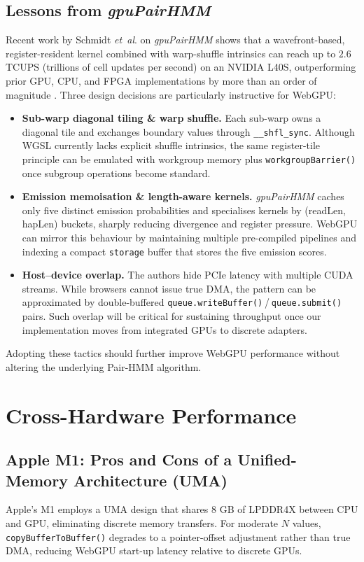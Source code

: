 \documentclass[PhD]{PHlab-thesis}
\begin{document}
\subsection{Lessons from \textit{gpuPairHMM}}
Recent work by Schmidt \emph{et~al}. on \textit{gpuPairHMM} shows that a wavefront-based, register-resident kernel combined with warp-shuffle intrinsics can reach up to $2.6$ TCUPS (trillions of cell updates per second) on an NVIDIA L40S, outperforming prior GPU, CPU, and FPGA implementations by more than an order of magnitude \cite{Schmidt2024gpuPairHMM}. Three design decisions are particularly instructive for WebGPU:

\begin{itemize}
  \item \textbf{Sub-warp diagonal tiling \& warp shuffle.}  
        Each sub-warp owns a diagonal tile and exchanges boundary values through \texttt{\_\_shfl\_sync}.  
        Although WGSL currently lacks explicit shuffle intrinsics, the same register-tile principle can be emulated with workgroup memory plus \texttt{workgroupBarrier()} once subgroup operations become standard.
  \item \textbf{Emission memoisation \& length-aware kernels.}  
        \textit{gpuPairHMM} caches only five distinct emission probabilities and specialises kernels by (readLen, hapLen) buckets, sharply reducing divergence and register pressure.  
        WebGPU can mirror this behaviour by maintaining multiple pre-compiled pipelines and indexing a compact \texttt{storage} buffer that stores the five emission scores.
  \item \textbf{Host–device overlap.}  
        The authors hide PCIe latency with multiple CUDA streams.  
        While browsers cannot issue true DMA, the pattern can be approximated by double-buffered \texttt{queue.writeBuffer()} / \texttt{queue.submit()} pairs.  
        Such overlap will be critical for sustaining throughput once our implementation moves from integrated GPUs to discrete adapters.
\end{itemize}

Adopting these tactics should further improve WebGPU performance without altering the underlying Pair-HMM algorithm.

\section{Cross-Hardware Performance}

\subsection{Apple M1: Pros and Cons of a Unified-Memory Architecture (UMA)}
Apple’s M1 employs a UMA design that shares 8 GB of LPDDR4X between CPU and GPU, eliminating discrete memory transfers.  
For moderate $N$ values, \texttt{copyBufferToBuffer()} degrades to a pointer-offset adjustment rather than true DMA, reducing WebGPU start-up latency relative to discrete GPUs.
\end{document}
